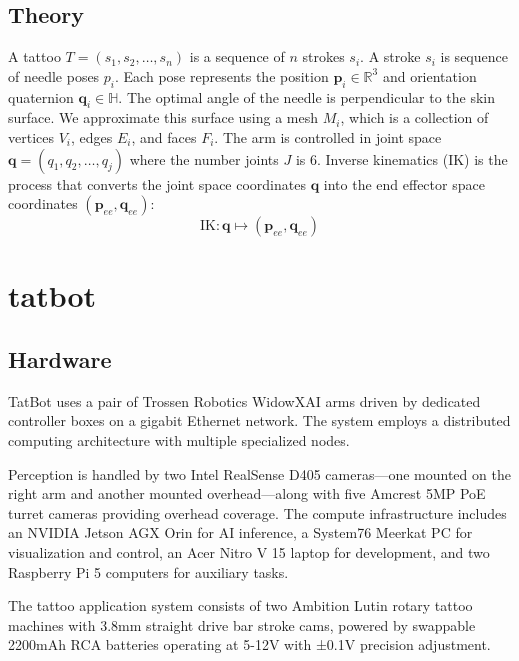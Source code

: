 \documentclass[11pt]{article}
\begin{document}
\subsection{Theory}

A tattoo $T = (s_1, s_2, \ldots, s_n)$ is a sequence of $n$ strokes $s_i$.
A stroke $s_i$ is sequence of needle poses $p_i$.
Each pose represents the position $\mathbf{p}_i \in \mathbb{R}^3$ and orientation quaternion $\mathbf{q}_i \in \mathbb{H}$.
The optimal angle of the needle is perpendicular to the skin surface.
We approximate this surface using a mesh $M_i$, which is a collection of vertices $V_i$, edges $E_i$, and faces $F_i$.
The arm is controlled in joint space $\mathbf{q} = (q_1, q_2, \ldots, q_j)$ where the number joints $J$ is $6$.
Inverse kinematics (IK) is the process that converts the joint space coordinates \( \mathbf{q} \) into the end effector space coordinates \( (\mathbf{p}_{ee}, \mathbf{q}_{ee}) \):
\[
\text{IK}: \mathbf{q} \mapsto (\mathbf{p}_{ee}, \mathbf{q}_{ee})
\]

\pagebreak

\section{tatbot}

\subsection{Hardware}

TatBot uses a pair of Trossen Robotics WidowXAI arms driven by dedicated controller boxes on a gigabit Ethernet network. The system employs a distributed computing architecture with multiple specialized nodes.

Perception is handled by two Intel RealSense D405 cameras---one mounted on the right arm and another mounted overhead---along with five Amcrest 5MP PoE turret cameras providing overhead coverage. The compute infrastructure includes an NVIDIA Jetson AGX Orin for AI inference, a System76 Meerkat PC for visualization and control, an Acer Nitro V 15 laptop for development, and two Raspberry Pi 5 computers for auxiliary tasks.

The tattoo application system consists of two Ambition Lutin rotary tattoo machines with 3.8mm straight drive bar stroke cams, powered by swappable 2200mAh RCA batteries operating at 5-12V with ±0.1V precision adjustment.
\end{document}
